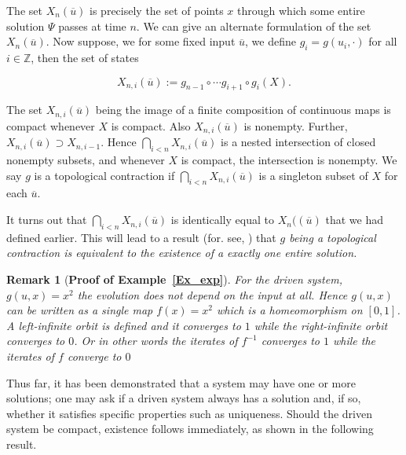 \documentclass[a4paper,12pt,twoside]{report}
\newtheorem{Definition}{Definition}[]
\newtheorem{Remark}{Remark}[]
\begin{document}
The set $X_n(\overline{u})$ is precisely the set of points $x$ through which some entire solution $\Psi$ passes at time $n$. We can give an alternate formulation of the set $X_n(\overline{u})$. 
Now suppose, we for some fixed input 
$\overline{u}$, we define $g_i = g(u_i,\cdot)$ for all $i\in \mathbb{Z}$, then the set of states

\begin{equation} \label{eqn_association}
X_{n,i}(\overline{u}) := g_{n-1} \circ \cdots g_{i+1} \circ g_i(X).
\end{equation}

The set $X_{n,i}(\overline{u})$ being the image of a finite composition of
continuous maps is compact whenever $X$ is compact. Also $X_{n,i}(\overline{u})$ is
nonempty.  Further, $X_{n,i}(\overline{u}) \supset X_{n,i-1}$. Hence $\bigcap_{i<n}
X_{n,i}(\overline{u})$ is a nested intersection of closed nonempty subsets, and
whenever $X$ is compact, the intersection is nonempty. We say $g$ is a topological contraction if $\bigcap_{i<n}X_{n,i}(\overline{u})$ is a singleton subset of $X$ for each $\overline{u}$. 

It turns out that $\bigcap_{i<n}X_{n,i}(\overline{u})$ is identically equal to $X_n((\overline{u})$ that we had defined earlier. This will lead to a result (for. see, \cite{manjunath2013echo}) that  \textit{$g$ being a topological contraction is equivalent to the existence of a exactly one entire solution.}


\begin{Remark}
  [\bf Proof of Example~\ref{Ex_exp}] \label{rem_proofEx} \rm
  For the driven system,  
  $g(u,x)=x^2$ the evolution does not depend on the input at all. Hence $g(u,x)$ can be written as a single map $f(x)=x^2$ which is a homeomorphism on $[0,1]$. A left-infinite orbit is defined and it converges to $1$ while the right-infinite orbit converges to $0$. Or in other words the iterates of $f^{-1}$ converges to $1$ while the iterates of $f$ converge to $0$ 
\end{Remark}

Thus far, it has been demonstrated that a system may have one or more solutions; one may ask if a driven system always has a solution and, if so, whether it satisfies specific properties such as uniqueness. 
Should the driven system be compact, existence follows immediately, as shown in the following result.
\end{document}
